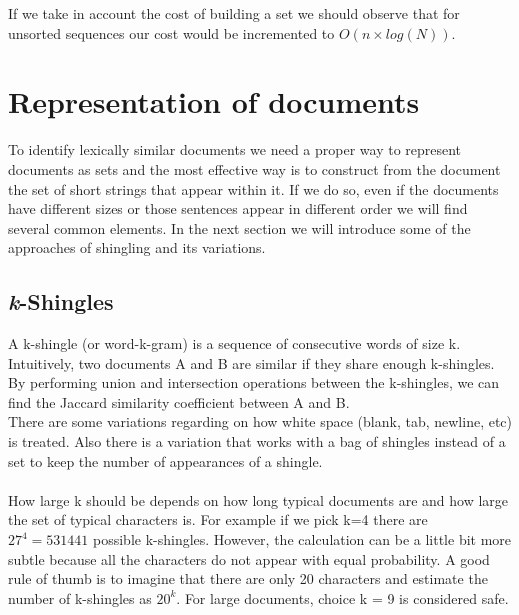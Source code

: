 \documentclass[12pt]{article}
\begin{document}
If we take in account the cost of building a set we should observe that for unsorted sequences our cost would be incremented to $O(n \times log(N))$.


\section{Representation of documents}

To identify lexically similar documents we need a proper way to represent documents as sets and the most effective way is to construct from the document the set of short strings that appear within it. If we do so, even if the documents have different sizes or those sentences appear in different order we will find several common elements. In the next section we will introduce some of the approaches of shingling and its variations.

\subsection{\textit{k}-Shingles} \label{kShingles}

A k-shingle (or word-k-gram) is a sequence of consecutive words of size k. Intuitively, two documents A and B are similar if they share enough k-shingles. By performing union and intersection operations between the k-shingles, we can find the Jaccard similarity coefficient between A and B. 
\\
There are some variations regarding on how white space (blank, tab, newline, etc) is treated. Also there is a variation that works with a bag of shingles instead of a set to keep the number of appearances of a shingle. \medskip \\
\\
How large k should be depends on how long typical documents are and how large the set of typical characters is. For example if we pick k=4 there are $27^4=531441 $ possible k-shingles. However, the calculation can be a little bit more subtle because all the characters do not appear with equal probability. A good rule of thumb is to imagine that there are only 20 characters and estimate the number of k-shingles as $20^k$. For large documents, choice k = 9 is considered safe. 
\end{document}
